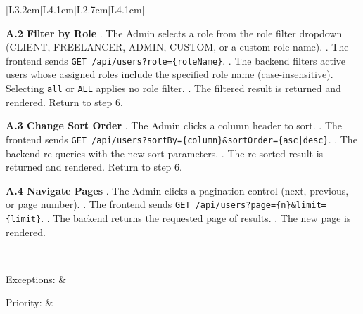 \begin{longtable}{|L{3.2cm}|L{4.1cm}|L{2.7cm}|L{4.1cm}|}
{\textbf{A.2 Filter by Role} . The Admin selects a role from the role filter dropdown (CLIENT, FREELANCER, ADMIN, CUSTOM, or a custom role name). . The frontend sends \texttt{GET /api/users?role=\{roleName\}}. . The backend filters active users whose assigned roles include the specified role name (case-insensitive). Selecting \texttt{all} or \texttt{ALL} applies no role filter. . The filtered result is returned and rendered. \newline
Return to step 6. \newline

\textbf{A.3 Change Sort Order} . The Admin clicks a column header to sort. . The frontend sends \texttt{GET /api/users?sortBy=\{column\}\&sortOrder=\{asc|desc\}}. . The backend re-queries with the new sort parameters. . The re-sorted result is returned and rendered. \newline
Return to step 6. \newline

\textbf{A.4 Navigate Pages} . The Admin clicks a pagination control (next, previous, or page number). . The frontend sends \texttt{GET /api/users?page=\{n\}\&limit=\{limit\}}. . The backend returns the requested page of results. . The new page is rendered.
} \\ \hline

Exceptions: &  \\ \hline

Priority: &  \\ \hline


\end{longtable}
